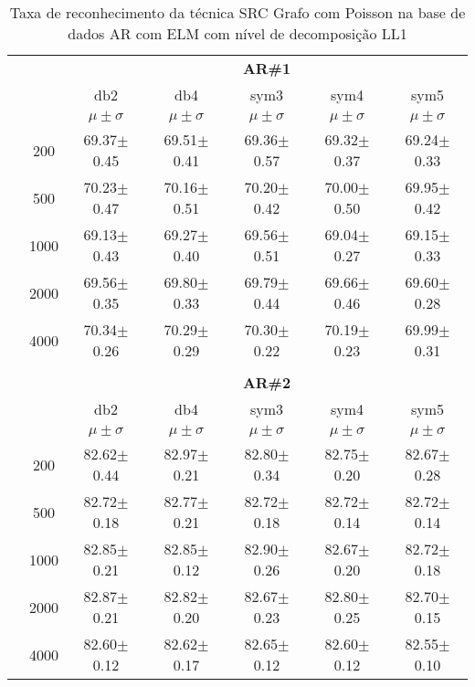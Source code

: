 \begin{table}[H]
	\centering
    \normalsize
	\caption{Taxa de reconhecimento da técnica SRC Grafo com Poisson na base de dados AR com ELM com nível de decomposição LL1}
		\begin{tabular}{|c|c|c c c c c|}
\cline{3-7}
\multicolumn{2}{c|}{\multirow{3}{*}{}} & \multicolumn{5}{c|}{\textbf{AR\#1}}   \\\cline{3-7} 
\multicolumn{2}{c|}{}  & db2 & db4 & sym3 & sym4 & sym5 \\\cline{3-7}%
\multicolumn{2}{c|}{}& $\mu \pm \sigma$ & $\mu \pm \sigma$ & $\mu \pm \sigma$ & $\mu \pm \sigma$ & $\mu \pm \sigma$ \\\hline


\multicolumn{1}{|c|}{ \multirow{5}{*}{\rotatebox[origin=c]{90}{\textbf{Neurônios}}} }
&200	&69.37$\pm$0.45	&69.51$\pm$0.41	&69.36$\pm$0.57	&69.32$\pm$0.37	&69.24$\pm$0.33	\\\cline{2-7}
&500	&70.23$\pm$0.47	&70.16$\pm$0.51	&70.20$\pm$0.42	&70.00$\pm$0.50	&69.95$\pm$0.42	\\\cline{2-7}
&1000	&69.13$\pm$0.43	&69.27$\pm$0.40	&69.56$\pm$0.51	&69.04$\pm$0.27	&69.15$\pm$0.33	\\\cline{2-7}
&2000	&69.56$\pm$0.35	&69.80$\pm$0.33	&69.79$\pm$0.44	&69.66$\pm$0.46	&69.60$\pm$0.28	\\\cline{2-7}
&4000	&70.34$\pm$0.26	&70.29$\pm$0.29	&70.30$\pm$0.22	&70.19$\pm$0.23	&69.99$\pm$0.31	
\\ \midrule
\multicolumn{7}{c}{}\\ 


\cline{3-7}
\multicolumn{2}{c|}{\multirow{3}{*}{}} & \multicolumn{5}{c|}{\textbf{AR\#2}}   \\\cline{3-7} 
\multicolumn{2}{c|}{}  & db2 & db4 & sym3 & sym4 & sym5 \\\cline{3-7}%
\multicolumn{2}{c|}{}& $\mu \pm \sigma$ & $\mu \pm \sigma$ & $\mu \pm \sigma$ & $\mu \pm \sigma$ & $\mu \pm \sigma$ \\\hline

\multicolumn{1}{|c|}{ \multirow{5}{*}{\rotatebox[origin=c]{90}{\textbf{Neurônios}}} }
&200	&82.62$\pm$0.44 &82.97$\pm$0.21 &82.80$\pm$0.34	&82.75$\pm$0.20	&82.67$\pm$0.28	\\\cline{2-7}
&500	&82.72$\pm$0.18	&82.77$\pm$0.21	&82.72$\pm$0.18	&82.72$\pm$0.14	&82.72$\pm$0.14	\\\cline{2-7}
&1000	&82.85$\pm$0.21	&82.85$\pm$0.12	&82.90$\pm$0.26	&82.67$\pm$0.20	&82.72$\pm$0.18	\\\cline{2-7}
&2000	&82.87$\pm$0.21	&82.82$\pm$0.20	&82.67$\pm$0.23	&82.80$\pm$0.25	&82.70$\pm$0.15	\\\cline{2-7}
&4000	&82.60$\pm$0.12	&82.62$\pm$0.17 &82.65$\pm$0.12	&82.60$\pm$0.12	&82.55$\pm$0.10	


\end{tabular}
\end{table}
